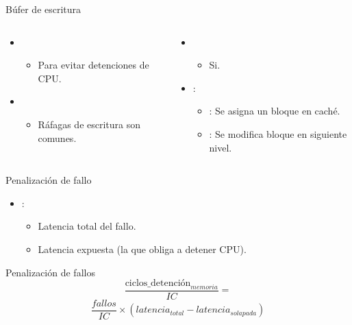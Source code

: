 \begin{frame}[t]{Búfer de escritura}
\makebox[\textwidth][c]{

}

\begin{columns}[T]

\begin{column}{.5\textwidth}
\begin{itemize}
  \item {}
    \begin{itemize}
      \item Para evitar detenciones de CPU.
    \end{itemize}
  \item {}
    \begin{itemize}
      \item Ráfagas de escritura son comunes.
    \end{itemize}
\end{itemize}
\end{column}

\begin{column}{.5\textwidth}
\begin{itemize}
  \item {}
    \begin{itemize}
      \item Si.
    \end{itemize}
  \item {}:
    \begin{itemize}
      \item {}: Se asigna un bloque en caché.
      \item {}: Se modifica bloque en siguiente nivel.
    \end{itemize}
\end{itemize}
\end{column}

\end{columns}
\end{frame}

\begin{frame}[t]{Penalización de fallo}
\begin{itemize}
  \item {}:
    \begin{itemize}
      \item Latencia total del fallo.
      \item Latencia expuesta (la que obliga a detener CPU).
    \end{itemize}
\end{itemize}
\begin{block}{Penalización de fallos}
\[
\frac{\text{ciclos\_detención}_{memoria}}{IC} =
\]
\[
\frac{fallos}{IC} \times \left( latencia_{total} - latencia_{solapada} \right)
\]
\end{block}
\end{frame}

